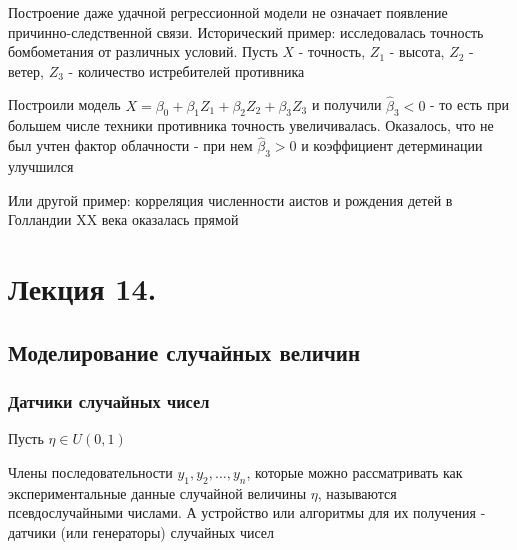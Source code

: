 \documentclass[12pt]{article}
\begin{document}
Построение даже удачной регрессионной модели не означает появление причинно-следственной связи. Исторический пример: исследовалась точность бомбометания от различных условий. Пусть $X$ - точность, $Z_1$ - высота, $Z_2$ - ветер, $Z_3$ - количество истребителей противника

Построили модель $X = \beta_0 + \beta_1 Z_1 + \beta_2 Z_2 + \beta_3 Z_3$ и получили $\hat \beta_3 < 0$ - то есть при большем числе техники противника точность увеличивалась. Оказалось, что не был учтен фактор облачности - при нем $\hat \beta_3 > 0$ и коэффициент детерминации улучшился

Или другой пример: корреляция численности аистов и рождения детей в Голландии XX века оказалась прямой













\section{Лекция 14.}

\subsection{Моделирование случайных величин}

\subsubsection{Датчики случайных чисел}

Пусть $\eta \in U(0, 1)$

\Def Члены последовательности $y_1, y_2, \dots, y_n$, которые можно рассматривать как экспериментальные данные случайной величины $\eta$, называются псевдослучайными числами. А устройство или алгоритмы для их получения - датчики (или генераторы) случайных чисел
\end{document}
